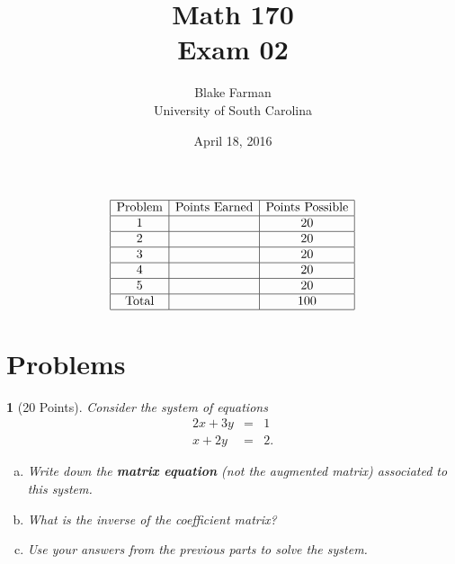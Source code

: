 \documentclass[12pt]{amsart}
\author{Blake Farman\\University of South Carolina}
\title{Math 170\\Exam 02}
\date{April 18, 2016}
\begin{document}
\maketitle

\begin{center}
\end{center}

\vspace{0.2in}
\vspace{0.2in}

\theoremstyle{plain}
\newtheorem{thm}{}
\newtheorem{lem}{Lemma}
\theoremstyle{definition}
\newtheorem{defn}{Definition}
$$
\begin{array}{|c|c|c|}
  \hline
  \text{Problem} & \text{Points Earned} & \text{Points Possible}\\
  \hline
  1 & & 20\\
  \hline
  2 & & 20\\
  \hline
  3 & & 20\\
  \hline
  4 & & 20\\
  \hline
  5 & & 20 \\
  \hline
  \text{Total} & & 100\\
  \hline
\end{array}
$$

\newpage

\section{Problems}

\begin{thm}[20 Points]\label{ex1}
  Consider the system of equations
  \begin{eqnarray*}
    2x + 3y &=& 1\\
    x + 2y &=& 2.
  \end{eqnarray*}
  \begin{enumerate}[(a)]
  \item\label{1.a}
    Write down the {\bf matrix equation} (not the augmented matrix) associated to this system.
    \vspace{1.5in}
  \item
    What is the inverse of the coefficient matrix?
    \vspace{2in}
  \item
    Use your answers from the previous parts to solve the system.
  \end{enumerate}
\end{thm}
\end{document}
